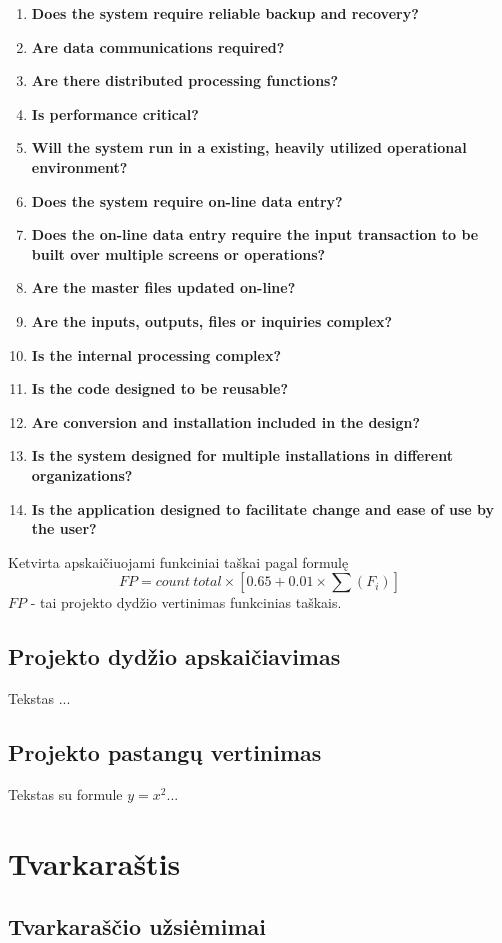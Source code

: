 \documentclass[a4paper,12pt]{article}
\begin{document}
\begin{enumerate}
\item \textbf{Does the system require reliable backup and recovery?}
\item \textbf{Are data communications required?}
\item \textbf{ Are there distributed processing functions?}
\item \textbf{Is performance critical?}
\item \textbf{Will the system run in a existing, heavily utilized operational environment?}
\item \textbf{Does the system require on-line data entry?}
\item \textbf{Does the on-line data entry require the input transaction to be built over multiple screens or operations?}
\item \textbf{Are the master files updated on-line?}
\item \textbf{Are the inputs, outputs, files or inquiries complex?}
\item \textbf{Is the internal processing complex?}
\item \textbf{Is the code designed to be reusable?}
\item \textbf{Are conversion and installation included in the design?}
\item \textbf{Is the system designed for multiple installations in different organizations?}
\item \textbf{Is the application designed to facilitate change and ease of use by the user?}
\end{enumerate}
Ketvirta apskaičiuojami funkciniai taškai pagal formulę
$$ FP = count\ total \times [0.65 + 0.01 \times \sum(F_i)] $$
$FP$ - tai projekto dydžio vertinimas funkcinias taškais.


\subsection{Projekto dydžio apskaičiavimas}
 Tekstas ...
 \subsection{Projekto pastangų vertinimas}
 Tekstas su formule $y=x^2$...
\clearpage 

\section{ Tvarkaraštis}
\subsection{Tvarkaraščio užsiėmimai}
\end{document}
